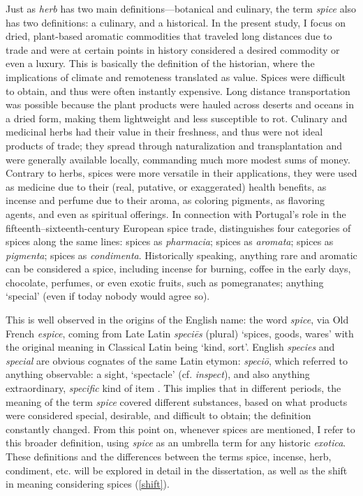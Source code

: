 Just as \textit{herb} has two main definitions---botanical and culinary, the term \textit{spice} also has two definitions: a culinary, and a historical. In the present study, I focus on dried, plant-based aromatic commodities that traveled long distances due to trade and were at certain points in history considered a desired commodity or even a luxury. This is basically the definition of the historian, where the implications of climate and remoteness translated as value. Spices were difficult to obtain, and thus were often instantly expensive. Long distance transportation was possible because the plant products were hauled across deserts and oceans in a dried form, making them lightweight and less susceptible to rot. Culinary and medicinal herbs had their value in their freshness, and thus were not ideal products of trade; they spread through naturalization and transplantation and were generally available locally, commanding much more modest sums of money. Contrary to herbs, spices were more versatile in their applications, they were used as medicine due to their (real, putative, or exaggerated) health benefits, as incense and perfume due to their aroma, as coloring pigments, as flavoring agents, and even as spiritual offerings. In connection with Portugal's role in the fifteenth--sixteenth-century European spice trade, \textcite{halikowski_smith_portugal_2001} distinguishes four categories of spices along the same lines: spices as \textit{pharmacia}; spices as \textit{aromata}; spices as \textit{pigmenta}; spices as \textit{condimenta}. Historically speaking, anything rare and aromatic can be considered a spice, including incense for burning, coffee in the early days, chocolate, perfumes, or even exotic fruits, such as pomegranates; anything `special' (even if today nobody would agree so).

This is well observed in the origins of the English name: the word \textit{spice}, via Old French \textit{espice}, coming from Late Latin \textit{speciēs} (plural) `spices, goods, wares' with the original meaning in Classical Latin being `kind, sort'. English \textit{species} and \textit{special} are obvious cognates of the same Latin etymon: \textit{speciō}, which referred to anything observable: a sight, `spectacle' (cf. \textit{inspect}), and also anything extraordinary, \textit{specific} kind of item \autocite[1983-84]{glare_oxford_2012}. This implies that in different periods, the meaning of the term \textit{spice} covered different substances, based on what products were considered special, desirable, and difficult to obtain; the definition constantly changed. From this point on, whenever spices are mentioned, I refer to this broader definition, using \textit{spice} as an umbrella term for any historic \textit{exotica}. These definitions and the differences between the terms spice, incense, herb, condiment, etc. will be explored in detail in the dissertation, as well as the shift in meaning considering spices (\cref{shift}).

